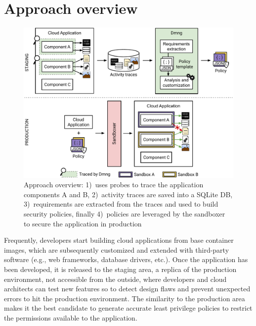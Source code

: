 \section{Approach overview}\label{sect:overview}

\begin{figure}[t!]
  \centering
  \hspace*{-0.35em}
  \includegraphics[width=1.01\linewidth]{chapters/dmng/fig/staging-prod.pdf}
  \caption[Overview of our approach]{Approach overview: 1)~\dmng uses
    probes to trace the application components A and B, 2)~activity
    traces are saved into a SQLite DB, 3)~requirements are extracted
    from the traces and used to build security policies, finally
    4)~policies are leveraged by the sandboxer to secure the
    application in production}
  \label{fig:overview}
\end{figure}

Frequently, developers start building cloud applications from base
container images, which are subsequently customized and extended with
third-party software (e.g., web frameworks, database drivers, etc.).
Once the application has been developed, it is released to the staging
area, a replica of the production environment, not accessible from the
outside, where developers and cloud architects can test new features
so to detect design flaws and prevent unexpected errors to hit the
production environment.  The similarity to the production area makes
it the best candidate to generate accurate least privilege policies to
restrict the permissions available to the application.


